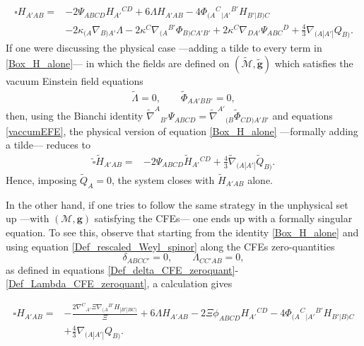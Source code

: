 \documentclass[10pt,a4paper]{article}
\theoremstyle{plain}
\def\bmg{{\bm g}}
\begin{document}
{\begin{align}\label{Box_H_alone}
\square H_{A'AB} = & -2 \Psi _{ABCD} H_{A'}{}^{CD} + 6 \Lambda
H_{A'AB} -4 \Phi _{(A}{}^{C}{}_{|A'}{}^{B'}H_{B'|B)C} \nonumber \\ &
-2 \kappa _{(A}\nabla_{B)A'}\Lambda -2
\kappa^{C}\nabla_{(A}{}^{B'}\Phi _{B)CA'B'} + 2 \kappa ^{C}
\nabla_{DA'}\Psi _{ABC}{}^{D} + \tfrac{4}{3} \nabla_{(A|A'|}Q_{B)}.
\end{align}
If one were discussing the physical case ---adding a tilde to every
term in \eqref{Box_H_alone}--- in which the fields are defined on
$(\tilde{\mathcal{M}},\tilde{\bmg})$ which satisfies the vacuum
Einstein field equations
\begin{align}\label{vaccumEFE}
  \tilde{\Lambda}=0, \qquad \tilde{\Phi}_{AA'BB'}=0,
\end{align}
then, using the Bianchi identity $\tilde{\nabla}^{A}{}_{B'}\Psi
_{ABCD}=\tilde{\nabla}^{A'}{}_{(B}\tilde{\Phi}_{CD)A'B'}$ and
equations \eqref{vaccumEFE},
the physical version of equation \eqref{Box_H_alone} ---formally adding a tilde---
reduces to
\begin{align}\label{Box_H_alone_physical}
  \tilde{\square} \tilde{H}_{A'AB} = & -2 \Psi _{ABCD} \tilde{H}_{A'}{}^{CD}
  + \tfrac{4}{3} \tilde{\nabla}_{(A|A'|}\tilde{Q}_{B)}.
\end{align}
Hence, imposing $\tilde{Q}_A=0$, the system
closes with $\tilde{H}_{A'AB}$ alone.


\medskip

In the other hand, if one tries to follow the same strategy in the unphysical set up
---with $(\mathcal{M},\bmg)$ satisfying the CFEs--- one ends up with a
formally singular equation. To see this, observe that starting from
the identity \eqref{Box_H_alone} and using equation \eqref{Def_rescaled_Weyl_spinor}
along the CFEs zero-quantities
\[ \delta_{ABCC'}=0, \qquad \Lambda_{CC'AB}=0,\]
as defined in equations \eqref{Def_delta_CFE_zeroquant}-\eqref{Def_Lambda_CFE_zeroquant},
a calculation gives

\begin{align}\label{WaveH_twistor_singular}
  \square H_{A'AB} = & - \frac{2 \nabla^{C}{}_{A'}\Xi
    \nabla_{(A}{}^{B'}H_{|B'|BC)}}{\Xi } + 6 \Lambda H_{A'AB} -2 \Xi
  \phi _{ABCD}H_{A'}{}^{CD} -4
  \Phi_{(A}{}^{C}{}_{|A'}{}^{B'}H_{B'|B)C} \nonumber \\ & +
  \tfrac{4}{3} \nabla_{(A|A'|}Q_{B)}.
\end{align}

}
\end{document}

